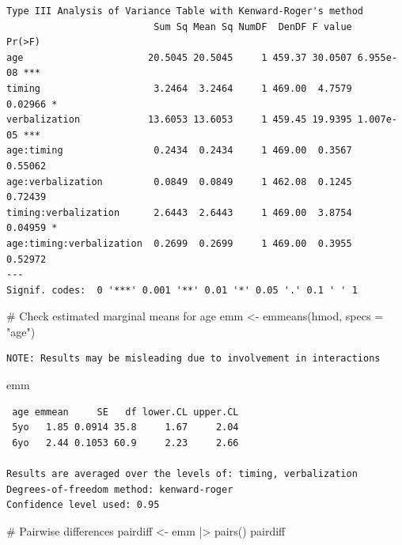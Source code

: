 \documentclass[
  11pt,
  letterpaper,
]{scrbook}
\newenvironment{Shaded}{\begin{snugshade}}{\end{snugshade}}
\newcommand{\AttributeTok}[1]{\textcolor[rgb]{0.40,0.45,0.13}{#1}}
\newcommand{\CommentTok}[1]{\textcolor[rgb]{0.37,0.37,0.37}{#1}}
\newcommand{\FunctionTok}[1]{\textcolor[rgb]{0.28,0.35,0.67}{#1}}
\newcommand{\NormalTok}[1]{\textcolor[rgb]{0.00,0.23,0.31}{#1}}
\newcommand{\OtherTok}[1]{\textcolor[rgb]{0.00,0.23,0.31}{#1}}
\newcommand{\SpecialCharTok}[1]{\textcolor[rgb]{0.37,0.37,0.37}{#1}}
\newcommand{\StringTok}[1]{\textcolor[rgb]{0.13,0.47,0.30}{#1}}
\theoremstyle{definition}
\theoremstyle{remark}
\begin{document}
\begin{verbatim}
Type III Analysis of Variance Table with Kenward-Roger's method
                          Sum Sq Mean Sq NumDF  DenDF F value    Pr(>F)    
age                      20.5045 20.5045     1 459.37 30.0507 6.955e-08 ***
timing                    3.2464  3.2464     1 469.00  4.7579   0.02966 *  
verbalization            13.6053 13.6053     1 459.45 19.9395 1.007e-05 ***
age:timing                0.2434  0.2434     1 469.00  0.3567   0.55062    
age:verbalization         0.0849  0.0849     1 462.08  0.1245   0.72439    
timing:verbalization      2.6443  2.6443     1 469.00  3.8754   0.04959 *  
age:timing:verbalization  0.2699  0.2699     1 469.00  0.3955   0.52972    
---
Signif. codes:  0 '***' 0.001 '**' 0.01 '*' 0.05 '.' 0.1 ' ' 1
\end{verbatim}

\begin{Shaded}
\begin{Highlighting}[]
\CommentTok{\# Check estimated marginal means for age}
\NormalTok{emm }\OtherTok{\textless{}{-}} \FunctionTok{emmeans}\NormalTok{(hmod, }\AttributeTok{specs =} \StringTok{"age"}\NormalTok{)}
\end{Highlighting}
\end{Shaded}

\begin{verbatim}
NOTE: Results may be misleading due to involvement in interactions
\end{verbatim}

\begin{Shaded}
\begin{Highlighting}[]
\NormalTok{emm}
\end{Highlighting}
\end{Shaded}

\begin{verbatim}
 age emmean     SE   df lower.CL upper.CL
 5yo   1.85 0.0914 35.8     1.67     2.04
 6yo   2.44 0.1053 60.9     2.23     2.66

Results are averaged over the levels of: timing, verbalization 
Degrees-of-freedom method: kenward-roger 
Confidence level used: 0.95 
\end{verbatim}

\begin{Shaded}
\begin{Highlighting}[]
\CommentTok{\# Pairwise differences}
\NormalTok{pairdiff }\OtherTok{\textless{}{-}}\NormalTok{ emm }\SpecialCharTok{|\textgreater{}} \FunctionTok{pairs}\NormalTok{()}
\NormalTok{pairdiff}
\end{Highlighting}
\end{Shaded}
\end{document}
